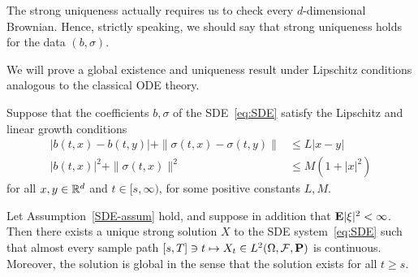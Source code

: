 \begin{remark}
	The strong uniqueness actually requires us to check every $d$-dimensional Brownian. Hence, strictly speaking, we should say that strong uniqueness holds for the data $(b,\sigma)$.
\end{remark}

We will prove a global existence and uniqueness result under Lipschitz conditions analogous to the classical ODE theory.

\begin{assumption}
	\label{SDE-assum}
	Suppose that the coefficients $b,\sigma$ of the SDE~\eqref{eq:SDE} satisfy the Lipschitz and linear growth conditions
	\begin{align}
		|b(t,x)-b(t,y)|+\|\sigma(t,x)-\sigma(t,y)\| &\le L|x-y| \label{eq:Lip}\\
		|b(t,x)|^2 + \|\sigma(t,x)\|^2 &\le M(1+|x|^2) \label{eq:growth}
	\end{align}
	for all $x,y\in\mathbb{R}^d$ and $t\in [s,\infty)$, for some positive constants $L,M$.
\end{assumption}

\begin{theorem}
\label{thm:SDE-exist-unique}
	Let Assumption~\ref{SDE-assum} hold, and suppose in addition that $\mathbf{E}|\xi|^2<\infty$. Then there exists a unique strong solution $X$ to the SDE system~\eqref{eq:SDE} such that almost every sample path $[s,T]\ni t\mapsto X_t\in L^2(\Omega,\mathcal{F},\mathbf{P})$ is continuous. Moreover, the solution is global in the sense that the solution exists for all $t\ge s$.
\end{theorem}


